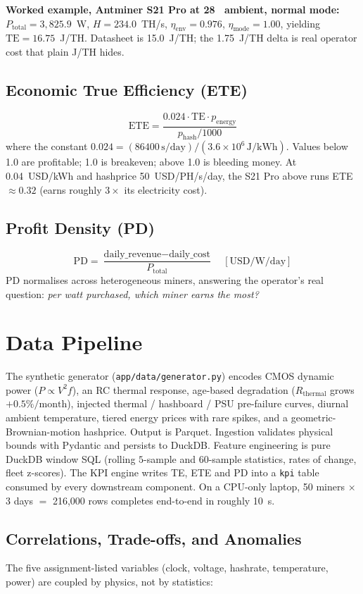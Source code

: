 \documentclass[11pt,a4paper]{article}
\begin{document}
\textbf{Worked example, Antminer S21 Pro at 28~\textcelsius{} ambient,
normal mode:} $P_{\text{total}} = 3{,}825.9$~W, $H = 234.0$~TH/s,
$\eta_{\text{env}} = 0.976$, $\eta_{\text{mode}} = 1.00$, yielding
$\text{TE} = 16.75$~J/TH. Datasheet is 15.0~J/TH; the 1.75~J/TH delta is real
operator cost that plain J/TH hides.

\subsection{Economic True Efficiency (ETE)}
\[
\text{ETE} = \frac{0.024 \cdot \text{TE} \cdot p_{\text{energy}}}{p_{\text{hash}} / 1000}
\]
where the constant $0.024 = (86400\,\text{s}/\text{day}) / (3.6 \times 10^6\,\text{J}/\text{kWh})$.
Values below 1.0 are profitable; 1.0 is breakeven; above 1.0 is bleeding
money. At 0.04~USD/kWh and hashprice 50~USD/PH/s/day, the S21 Pro above runs
ETE $\approx 0.32$ (earns roughly $3\times$ its electricity cost).

\subsection{Profit Density (PD)}
\[
\text{PD} = \frac{\text{daily\_revenue} - \text{daily\_cost}}{P_{\text{total}}}
\quad [\text{USD/W/day}]
\]
PD normalises across heterogeneous miners, answering the operator's real
question: \emph{per watt purchased, which miner earns the most?}

\section{Data Pipeline}
The synthetic generator (\texttt{app/data/generator.py}) encodes CMOS
dynamic power ($P \propto V^2 f$), an RC thermal response, age-based
degradation ($R_{\text{thermal}}$ grows $+0.5\%/\text{month}$), injected
thermal / hashboard / PSU pre-failure curves, diurnal ambient temperature,
tiered energy prices with rare spikes, and a geometric-Brownian-motion
hashprice. Output is Parquet. Ingestion validates physical bounds with
Pydantic and persists to DuckDB. Feature engineering is pure DuckDB window
SQL (rolling $5$-sample and $60$-sample statistics, rates of change, fleet
z-scores). The KPI engine writes TE, ETE and PD into a \texttt{kpi} table
consumed by every downstream component. On a CPU-only laptop, 50 miners
$\times$ 3 days $=$ 216{,}000 rows completes end-to-end in roughly 10~s.

\subsection{Correlations, Trade-offs, and Anomalies}
The five assignment-listed variables (clock, voltage, hashrate, temperature,
power) are coupled by physics, not by statistics:
\end{document}
